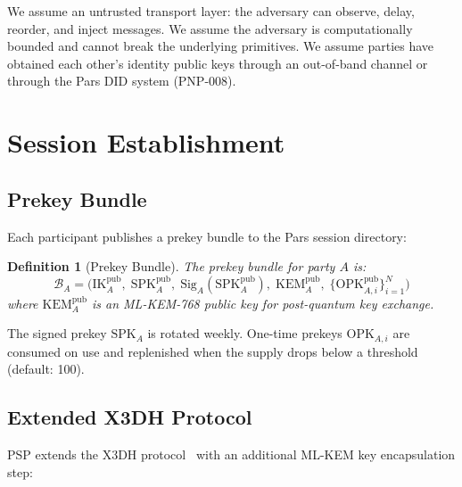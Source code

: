 \documentclass[11pt,a4paper]{article}
\newtheorem{definition}{Definition}[section]
\begin{document}
We assume an untrusted transport layer: the adversary can observe, delay,
reorder, and inject messages.  We assume the adversary is computationally
bounded and cannot break the underlying primitives.  We assume parties have
obtained each other's identity public keys through an out-of-band channel
or through the Pars DID system (PNP-008).

\section{Session Establishment}
\label{sec:establishment}

\subsection{Prekey Bundle}

Each participant publishes a prekey bundle to the Pars session directory:

\begin{definition}[Prekey Bundle]
    The prekey bundle for party $A$ is:
    \[
        \mathcal{B}_A = \bigl(
            \mathrm{IK}_A^{\mathrm{pub}},\;
            \mathrm{SPK}_A^{\mathrm{pub}},\;
            \mathrm{Sig}_A(\mathrm{SPK}_A^{\mathrm{pub}}),\;
            \mathrm{KEM}_A^{\mathrm{pub}},\;
            \{\mathrm{OPK}_{A,i}^{\mathrm{pub}}\}_{i=1}^{N}
        \bigr)
    \]
    where $\mathrm{KEM}_A^{\mathrm{pub}}$ is an ML-KEM-768 public key for
    post-quantum key exchange.
\end{definition}

The signed prekey $\mathrm{SPK}_A$ is rotated weekly.  One-time prekeys
$\mathrm{OPK}_{A,i}$ are consumed on use and replenished when the supply
drops below a threshold (default: 100).

\subsection{Extended X3DH Protocol}

PSP extends the X3DH protocol~\cite{marlinspike2016x3dh} with an
additional ML-KEM key encapsulation step:
\end{document}
